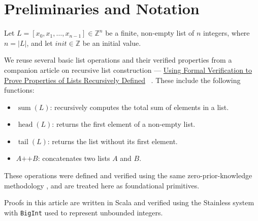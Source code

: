 \section{Preliminaries and Notation}
\label{sec:preliminaries}

Let $L = [x_0, x_1, \dots, x_{n-1}] \in \mathbb{Z}^n$ be a finite,
non-empty list of $n$ integers, where $n = \lvert L\rvert$, and let
$init \in \mathbb{Z}$ be an initial value.

We reuse several basic list operations and their verified properties from
a companion article on recursive list construction ---
\href{https://rxiverse.org/abs/2609.0023}{Using
Formal Verification to Prove Properties of Lists Recursively Defined}~%
\cite{mata2026lists}. These include the following functions:

\begin{itemize}
  \item $\operatorname{sum}(L)$: recursively computes the total sum of
    elements in a list.
  \item $\operatorname{head}(L)$: returns the first element of a non-empty
    list.
  \item $\operatorname{tail}(L)$: returns the list without its first
    element.
  \item $A \mathbin{\texttt{++}} B$: concatenates two lists $A$ and $B$.
\end{itemize}

These operations were defined and verified using the same
zero-prior-knowledge methodology \cite{mata2026lists}, and are treated
here as foundational primitives.

Proofs in this article are written in Scala and verified using the
Stainless system with \texttt{BigInt} used to represent unbounded
integers.
